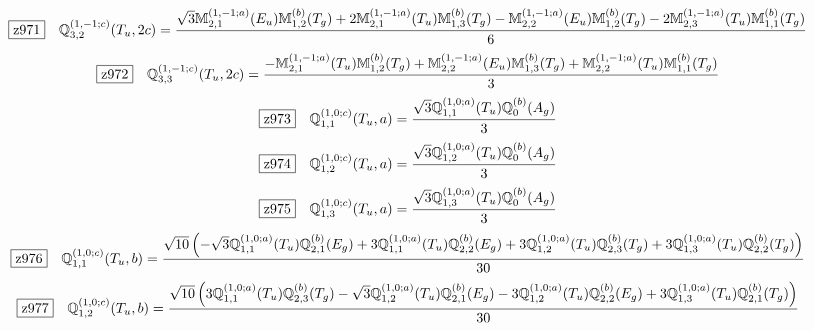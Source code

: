 \documentclass[fleqn,10pt,landscape]{jsarticle}
\begin{document}
\begin{dmath*}
\hspace*{3mm}\fbox{z971}\quad \mathbb{Q}_{3,2}^{(1,-1;c)}(T_{u},2c)=\frac{\sqrt{3} \mathbb{M}_{2,1}^{(1,-1;a)}(E_{u}) \mathbb{M}_{1,2}^{(b)}(T_{g}) + 2 \mathbb{M}_{2,1}^{(1,-1;a)}(T_{u}) \mathbb{M}_{1,3}^{(b)}(T_{g}) - \mathbb{M}_{2,2}^{(1,-1;a)}(E_{u}) \mathbb{M}_{1,2}^{(b)}(T_{g}) - 2 \mathbb{M}_{2,3}^{(1,-1;a)}(T_{u}) \mathbb{M}_{1,1}^{(b)}(T_{g})}{6}
\end{dmath*}
\begin{dmath*}
\hspace*{3mm}\fbox{z972}\quad \mathbb{Q}_{3,3}^{(1,-1;c)}(T_{u},2c)=\frac{- \mathbb{M}_{2,1}^{(1,-1;a)}(T_{u}) \mathbb{M}_{1,2}^{(b)}(T_{g}) + \mathbb{M}_{2,2}^{(1,-1;a)}(E_{u}) \mathbb{M}_{1,3}^{(b)}(T_{g}) + \mathbb{M}_{2,2}^{(1,-1;a)}(T_{u}) \mathbb{M}_{1,1}^{(b)}(T_{g})}{3}
\end{dmath*}
\begin{dmath*}
\hspace*{3mm}\fbox{z973}\quad \mathbb{Q}_{1,1}^{(1,0;c)}(T_{u},a)=\frac{\sqrt{3} \mathbb{Q}_{1,1}^{(1,0;a)}(T_{u}) \mathbb{Q}_{0}^{(b)}(A_{g})}{3}
\end{dmath*}
\begin{dmath*}
\hspace*{3mm}\fbox{z974}\quad \mathbb{Q}_{1,2}^{(1,0;c)}(T_{u},a)=\frac{\sqrt{3} \mathbb{Q}_{1,2}^{(1,0;a)}(T_{u}) \mathbb{Q}_{0}^{(b)}(A_{g})}{3}
\end{dmath*}
\begin{dmath*}
\hspace*{3mm}\fbox{z975}\quad \mathbb{Q}_{1,3}^{(1,0;c)}(T_{u},a)=\frac{\sqrt{3} \mathbb{Q}_{1,3}^{(1,0;a)}(T_{u}) \mathbb{Q}_{0}^{(b)}(A_{g})}{3}
\end{dmath*}
\begin{dmath*}
\hspace*{3mm}\fbox{z976}\quad \mathbb{Q}_{1,1}^{(1,0;c)}(T_{u},b)=\frac{\sqrt{10} \left(- \sqrt{3} \mathbb{Q}_{1,1}^{(1,0;a)}(T_{u}) \mathbb{Q}_{2,1}^{(b)}(E_{g}) + 3 \mathbb{Q}_{1,1}^{(1,0;a)}(T_{u}) \mathbb{Q}_{2,2}^{(b)}(E_{g}) + 3 \mathbb{Q}_{1,2}^{(1,0;a)}(T_{u}) \mathbb{Q}_{2,3}^{(b)}(T_{g}) + 3 \mathbb{Q}_{1,3}^{(1,0;a)}(T_{u}) \mathbb{Q}_{2,2}^{(b)}(T_{g})\right)}{30}
\end{dmath*}
\begin{dmath*}
\hspace*{3mm}\fbox{z977}\quad \mathbb{Q}_{1,2}^{(1,0;c)}(T_{u},b)=\frac{\sqrt{10} \left(3 \mathbb{Q}_{1,1}^{(1,0;a)}(T_{u}) \mathbb{Q}_{2,3}^{(b)}(T_{g}) - \sqrt{3} \mathbb{Q}_{1,2}^{(1,0;a)}(T_{u}) \mathbb{Q}_{2,1}^{(b)}(E_{g}) - 3 \mathbb{Q}_{1,2}^{(1,0;a)}(T_{u}) \mathbb{Q}_{2,2}^{(b)}(E_{g}) + 3 \mathbb{Q}_{1,3}^{(1,0;a)}(T_{u}) \mathbb{Q}_{2,1}^{(b)}(T_{g})\right)}{30}
\end{dmath*}
\end{document}
